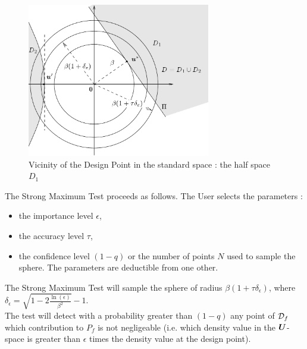 \begin{figure}[H]
  \begin{center}
    \includegraphics[width = 8cm]{StrongMaxTest_vicinity.png}
    \caption{Vicinity of the Design Point in the standard space : the half space $D_1$}
    \label{vicinity}
  \end{center}
\end{figure}

The Strong Maximum Test proceeds as follows. The User selects the parameters :
\begin{itemize}
\item the importance level $\epsilon$,
\item the accuracy level $\tau$,
\item the confidence level $(1 - q)$ or the number of points $N$ used to sample the sphere. The parameters are deductible from one other.
\end{itemize}
The Strong Maximum Test will sample the sphere of radius  $\beta(1+\tau  \delta_{\epsilon})$, where  $\delta_{\epsilon} =        \sqrt{1 - 2 \frac{\ln(\epsilon)}{\beta^2}}- 1$. \\
The test will detect with a probability greater than $(1 - q)$ any point of ${\mathcal D}_f$ which contribution to $P_f$ is not negligeable (i.e. which density value in the ${\boldsymbol{U}}$-space is greater than $\epsilon$ times the density value  at the design point).\\

